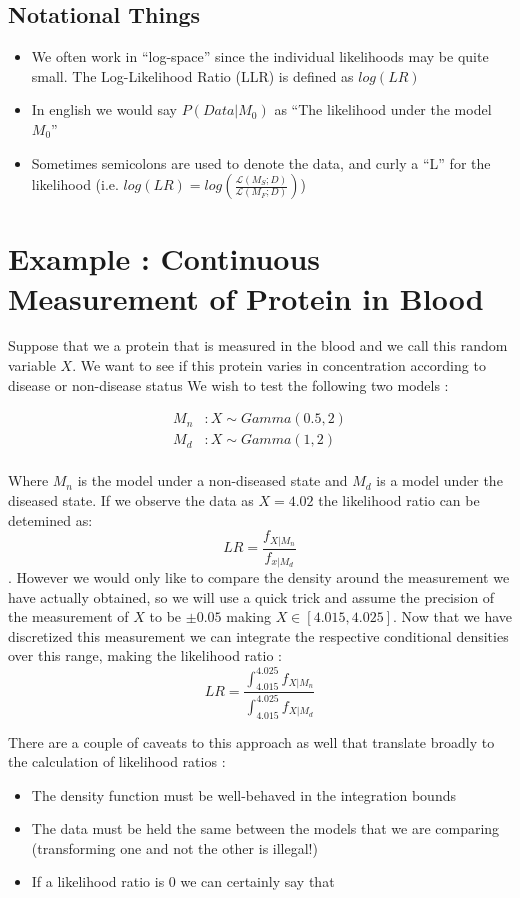 \documentclass[12pt]{report}
\begin{document}
\subsection{Notational Things}
\begin{itemize}
\item We often work in ``log-space'' since the individual likelihoods may be quite small. The Log-Likelihood Ratio (LLR) is defined as $log(LR)$
\item In english we would say $P(Data | M_0)$ as ``The likelihood under the model $M_0$''
\item Sometimes semicolons are used to denote the data, and curly a ``L'' for the likelihood (i.e. $log(LR) = log\left( \frac{\mathcal{L}(M_S ; D)}{ \mathcal{L}(M_F ; D)}\right)$)
\end{itemize}

\section{Example : Continuous Measurement of Protein in Blood}
Suppose that we a protein that is measured in the blood and we call this random variable $X$. We want to see if this protein varies in concentration according to disease or non-disease status We wish to test the following two models :

\begin{align*}
M_n &: X \sim Gamma(0.5, 2)\\
M_d &: X \sim Gamma(1,2)\\
\end{align*}

Where $M_n$ is the model under a non-diseased state and $M_d$ is a model under the diseased state. If we observe the data as $X = 4.02$ the likelihood ratio can be detemined as: $$ LR = \frac{f_{X|M_n}}{ f_{x | M_d}}$$. However we would only like to compare the density around the measurement we have actually obtained, so we will use a quick trick and assume the precision of the measurement of $X$ to be $\pm 0.05$ making $X \in [4.015, 4.025]$. Now that we have discretized this measurement we can integrate the respective conditional densities over this range, making the likelihood ratio : 
$$ LR = \frac{ \int^{4.025}_{4.015} f_{X | M_n} }{\int^{4.025}_{4.015} f_{X | M_d} }$$

There are a couple of caveats to this approach as well that translate broadly to the calculation of likelihood ratios : 

\begin{itemize}
	\item The density function must be well-behaved in the integration bounds
	\item The data must be held the same between the models that we are comparing (transforming one and not the other is illegal!)
	\item If a likelihood ratio is 0 we can certainly say that 
\end{itemize}
\end{document}
